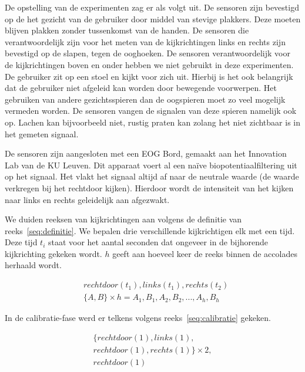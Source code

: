 \documentclass{article}
\begin{document}
De opstelling van de experimenten zag er als volgt uit. De sensoren zijn bevestigd op de het gezicht van de gebruiker door middel van stevige plakkers. Deze moeten blijven plakken zonder tussenkomst van de handen. De sensoren die verantwoordelijk zijn voor het meten van de kijkrichtingen links en rechts zijn bevestigd op de slapen, tegen de ooghoeken. De sensoren verantwoordelijk voor de kijkrichtingen boven en onder hebben we niet gebruikt in deze experimenten. De gebruiker zit op een stoel en kijkt voor zich uit. Hierbij is het ook belangrijk dat de gebruiker niet afgeleid kan worden door bewegende voorwerpen. Het gebruiken van andere gezichtsspieren dan de oogspieren moet zo veel mogelijk vermeden worden. De sensoren vangen de signalen van deze spieren namelijk ook op. Lachen kan bijvoorbeeld niet, rustig praten kan zolang het niet zichtbaar is in het gemeten signaal.

De sensoren zijn aangesloten met een EOG Bord, gemaakt aan het Innovation Lab van de KU Leuven. Dit apparaat voert al een naïve biopotentiaalfiltering uit op het signaal. Het vlakt het signaal altijd af naar de neutrale waarde (de waarde verkregen bij het rechtdoor kijken). Hierdoor wordt de intensiteit van het kijken naar links en rechts geleidelijk aan afgezwakt.

We duiden reeksen van kijkrichtingen aan volgens de definitie van reeks~\ref{seq:definitie}. We bepalen drie verschillende kijkrichtigen elk met een tijd. Deze tijd $t_i$ staat voor het aantal seconden dat ongeveer in de bijhorende kijkrichting gekeken wordt. $h$ geeft aan hoeveel keer de reeks binnen de accolades herhaald wordt.

\begin{equation}
\label{seq:definitie}
\begin{aligned}
& rechtdoor(t_1),  links (t_1), rechts (t_2) \\
& \{ A, B\} \times h = A_1, B_1, A_2, B_2, ... , A_h, B_h
\end{aligned}
\end{equation}

In de calibratie-fase werd er telkens volgens reeks~\ref{seq:calibratie} gekeken.

\begin{equation}
\label{seq:calibratie}
\begin{aligned}
&\{rechtdoor(1), links(1), &\\
&rechtdoor(1), rechts(1)\} \times 2, &\\
& rechtdoor(1)&
\end{aligned}
\end{equation}
\end{document}
